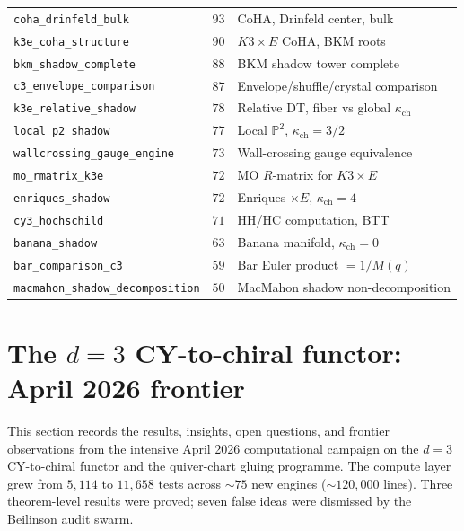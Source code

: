 \documentclass[11pt]{article}
\newcommand{\bP}{\mathbb{P}}
\begin{document}
\begin{center}
\begin{longtable}{lrl}
 \texttt{coha\_drinfeld\_bulk} & $93$ & CoHA, Drinfeld center, bulk \\
 \texttt{k3e\_coha\_structure} & $90$ & $K3 \times E$ CoHA, BKM roots \\
 \texttt{bkm\_shadow\_complete} & $88$ & BKM shadow tower complete \\
 \texttt{c3\_envelope\_comparison} & $87$ & Envelope/shuffle/crystal comparison \\
 \texttt{k3e\_relative\_shadow} & $78$ & Relative DT, fiber vs global $\kappa_{\mathrm{ch}}$ \\
 \texttt{local\_p2\_shadow} & $77$ & Local $\bP^2$, $\kappa_{\mathrm{ch}} = 3/2$ \\
 \texttt{wallcrossing\_gauge\_engine} & $73$ & Wall-crossing gauge equivalence \\
 \texttt{mo\_rmatrix\_k3e} & $72$ & MO $R$-matrix for $K3 \times E$ \\
 \texttt{enriques\_shadow} & $72$ & Enriques $\times E$, $\kappa_{\mathrm{ch}} = 4$ \\
 \texttt{cy3\_hochschild} & $71$ & HH/HC computation, BTT \\
 \texttt{banana\_shadow} & $63$ & Banana manifold, $\kappa_{\mathrm{ch}} = 0$ \\
 \texttt{bar\_comparison\_c3} & $59$ & Bar Euler product $= 1/M(q)$ \\
 \texttt{macmahon\_shadow\_decomposition} & $50$ & MacMahon shadow non-decomposition \\
 \bottomrule
\end{longtable}
\end{center}

\section{The $d = 3$ CY-to-chiral functor: April 2026 frontier}
\label{sec:cy3-frontier-april2026}

This section records the results, insights, open questions, and frontier observations from the
intensive April 2026 computational campaign on the $d = 3$ CY-to-chiral functor and the
quiver-chart gluing programme. The compute layer grew from $5{,}114$ to $11{,}658$ tests
across $\sim\! 75$ new engines ($\sim\!120{,}000$ lines). Three theorem-level results were
proved; seven false ideas were dismissed by the Beilinson audit swarm.
\end{document}
